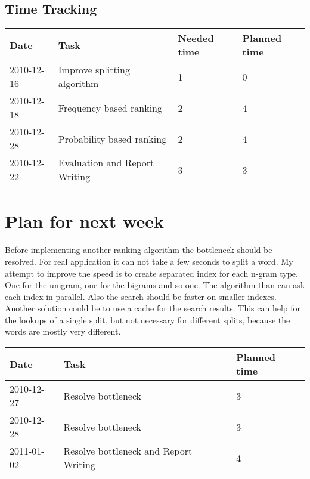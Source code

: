 \documentclass[11pt, accentcolor=tud9b, nochapname]{tudexercise}
\begin{document}
\subsection{Time Tracking}

\begin{tabular}{l | l | l | l}
  \hline
  \textbf{Date} & \textbf{Task} & \textbf{Needed time} & \textbf{Planned time} \\ \hline
  2010-12-16 & Improve splitting algorithm & 1 & 0 \\ \hline
  2010-12-18 & Frequency based ranking & 2 & 4 \\ \hline
  2010-12-28 & Probability based ranking & 2 & 4  \\ \hline
  2010-12-22 & Evaluation and Report Writing & 3 & 3 \\ \hline
\end{tabular}

\section{Plan for next week}
Before implementing another ranking algorithm the bottleneck should be resolved. For real application it can not take a few seconds to split a word. My attempt to improve the speed is to create separated index for each n-gram type. One for the unigram, one for the bigrams and so one. The algorithm than can ask each index in parallel. Also the search should be faster on smaller indexes. Another solution could be to use a cache for the search results. This can help for the lookups of a single split, but not necessary for different splits, because the words are mostly very different.

\vspace{10pt}
\begin{tabular}{l | l | l}
  \hline
  \textbf{Date} & \textbf{Task} & \textbf{Planned time} \\ \hline
  2010-12-27 & Resolve bottleneck & 3 \\ \hline
  2010-12-28 & Resolve bottleneck & 3 \\ \hline
  2011-01-02 & Resolve bottleneck and Report Writing & 4 \\ \hline
\end{tabular}
\end{document}
